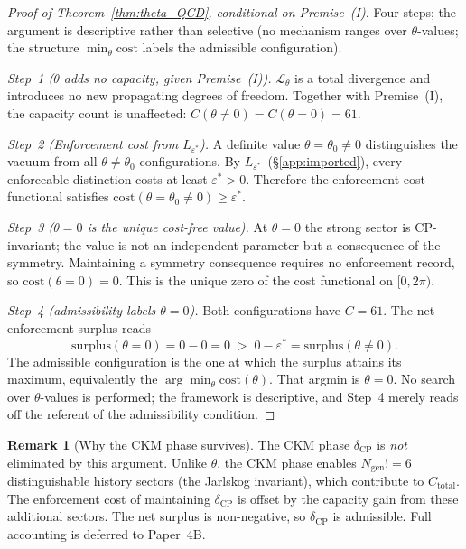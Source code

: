 \documentclass[11pt,a4paper]{article}
\theoremstyle{definition}
\newtheorem{remark}[theorem]{Remark}
\begin{document}
\begin{proof}[Proof of Theorem~\ref{thm:theta_QCD}, conditional on Premise~(I)]
Four steps; the argument is descriptive rather than selective (no
mechanism ranges over $\theta$-values; the structure $\min_{\theta}\mathrm{cost}$
labels the admissible configuration).

\textit{Step~1 ($\theta$ adds no capacity, given Premise~(I)).}
$\mathcal{L}_\theta$ is a total divergence and introduces no new
propagating degrees of freedom.  Together with Premise~(I), the
capacity count is unaffected: $C(\theta \ne 0) = C(\theta = 0) = 61$.

\textit{Step~2 (Enforcement cost from $L_{\varepsilon^*}$).}
A definite value $\theta = \theta_0 \ne 0$ distinguishes the vacuum
from all $\theta \ne \theta_0$ configurations.  By
$L_{\varepsilon^*}$~(\S\ref{app:imported}), every enforceable
distinction costs at least $\varepsilon^* > 0$.  Therefore the
enforcement-cost functional satisfies
$\mathrm{cost}(\theta = \theta_0 \ne 0) \ge \varepsilon^*$.

\textit{Step~3 ($\theta = 0$ is the unique cost-free value).}
At $\theta = 0$ the strong sector is CP-invariant; the value is not
an independent parameter but a consequence of the symmetry.
Maintaining a symmetry consequence requires no enforcement record,
so $\mathrm{cost}(\theta = 0) = 0$.  This is the unique zero of the
cost functional on $[0, 2\pi)$.

\textit{Step~4 (admissibility labels $\theta = 0$).}
Both configurations have $C = 61$.  The net enforcement surplus
reads
\[
  \mathrm{surplus}(\theta = 0) = 0 - 0 = 0
  \;>\;
  0 - \varepsilon^* = \mathrm{surplus}(\theta \ne 0).
\]
The admissible configuration is the one at which the surplus attains
its maximum, equivalently the $\arg\min_\theta \mathrm{cost}(\theta)$.
That argmin is $\theta = 0$.  No search over $\theta$-values is
performed; the framework is descriptive, and Step~4 merely reads off
the referent of the admissibility condition.
\end{proof}

\begin{remark}[Why the CKM phase survives]
The CKM phase $\delta_{\mathrm{CP}}$ is \emph{not} eliminated by this
argument.  Unlike $\theta$, the CKM phase enables $N_{\mathrm{gen}}!
= 6$ distinguishable history sectors (the Jarlskog invariant), which
contribute to $C_{\mathrm{total}}$.  The enforcement cost of maintaining
$\delta_{\mathrm{CP}}$ is offset by the capacity gain from these
additional sectors.  The net surplus is non-negative, so $\delta_{\mathrm{CP}}$
is admissible.  Full accounting is deferred to Paper~4B.
\end{remark}
\end{document}
